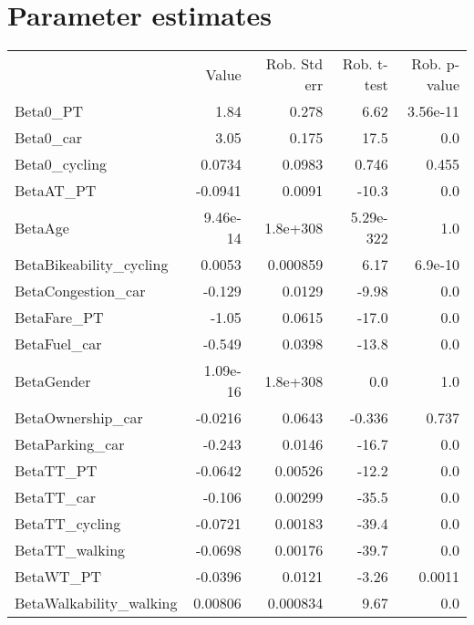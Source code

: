 \section{Parameter estimates}
\begin{tabular}{lrrrr}
 & Value & Rob. Std err & Rob. t-test & Rob. p-value \\
Beta0_PT & 1.84 & 0.278 & 6.62 & 3.56e-11 \\
Beta0_car & 3.05 & 0.175 & 17.5 & 0.0 \\
Beta0_cycling & 0.0734 & 0.0983 & 0.746 & 0.455 \\
BetaAT_PT & -0.0941 & 0.0091 & -10.3 & 0.0 \\
BetaAge & 9.46e-14 & 1.8e+308 & 5.29e-322 & 1.0 \\
BetaBikeability_cycling & 0.0053 & 0.000859 & 6.17 & 6.9e-10 \\
BetaCongestion_car & -0.129 & 0.0129 & -9.98 & 0.0 \\
BetaFare_PT & -1.05 & 0.0615 & -17.0 & 0.0 \\
BetaFuel_car & -0.549 & 0.0398 & -13.8 & 0.0 \\
BetaGender & 1.09e-16 & 1.8e+308 & 0.0 & 1.0 \\
BetaOwnership_car & -0.0216 & 0.0643 & -0.336 & 0.737 \\
BetaParking_car & -0.243 & 0.0146 & -16.7 & 0.0 \\
BetaTT_PT & -0.0642 & 0.00526 & -12.2 & 0.0 \\
BetaTT_car & -0.106 & 0.00299 & -35.5 & 0.0 \\
BetaTT_cycling & -0.0721 & 0.00183 & -39.4 & 0.0 \\
BetaTT_walking & -0.0698 & 0.00176 & -39.7 & 0.0 \\
BetaWT_PT & -0.0396 & 0.0121 & -3.26 & 0.0011 \\
BetaWalkability_walking & 0.00806 & 0.000834 & 9.67 & 0.0 \\
\end{tabular}

